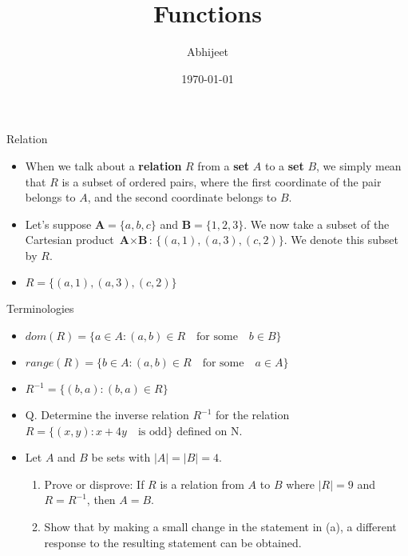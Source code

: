 \documentclass{beamer}
\title{Functions}
\author{Abhijeet}
\institute{IGIDR}
\date{\today}
\begin{document}
\begin{frame}[plain]
  \titlepage
\end{frame}

\begin{frame}{Relation}
\begin{itemize}
    \item When we talk about a \textbf{relation} $R$ from a \textbf{set} $A$ to a \textbf{set} $B$, we simply mean that $R$ is a subset of ordered pairs, where the first coordinate of the pair belongs to $A$, and the second coordinate belongs to $B$.
    \item Let's suppose $\textbf{A} = \{a, b, c\}$ and $\textbf{B} = \{1, 2, 3\}$. We now take a subset of the Cartesian product $\textbf{A} \times \textbf{B}$: $\{(a, 1), (a, 3), (c,2)\}$. We denote this subset by $R$.  
    \item $R = \{(a, 1), (a, 3), (c,2)\}$
\end{itemize}
\end{frame}


\begin{frame}{Terminologies}
    \begin{itemize}
        \item $dom(R)= \{a \in A : (a,b) \in R \quad\text{for some} \quad b \in B\}$
        \item $range(R)= \{b \in A : (a,b) \in R \quad\text{for some} \quad a \in A\}$
        \item $R^{-1}=\{(b,a):(b,a) \in  R\}$
        \item Q. Determine the inverse relation $R^{-1}$ for the relation $R = \{(x, y) : x + 4y \quad \text{is odd}\}$ deﬁned on N.
        \item Let $A$ and $B$ be sets with $|A| = |B| = 4$.

        \begin{enumerate}
             \item Prove or disprove: If $R$ is a relation from $A$ to $B$ where $|R| = 9$ and $R = R^{-1}$, then $A = B$.
             \item Show that by making a small change in the statement in (a), a different response to the resulting statement can be obtained.
        \end{enumerate}
        \end{itemize} 

\end{frame}
\end{document}
